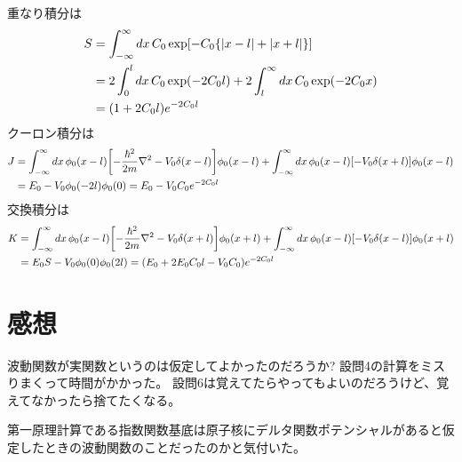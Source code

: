 \documentclass[../ap_2008.tex]{subfiles}
\begin{document}
\section{}
重なり積分は
\begin{equation}\begin{aligned}[b]
    S &= \int_{-\infty}^\infty dx\,C_0\exp[-C_0\qty{\abs{x-l}+\abs{x+l}}]\\
    &= 2\int_0^l dx\,C_0 \exp(-2C_0l) + 2 \int_l^{\infty}dx\,C_0\exp(-2C_0x)\\
    &= (1+2C_0l)e^{-2C_0l}
\end{aligned}\end{equation}
クーロン積分は
\begin{equation}\begin{aligned}[b]
    J &=\int_{-\infty}^\infty dx\, \phi_0(x-l)\qty[-\frac{\hbar^2}{2m}\laplacian-V_0\delta(x-l)]\phi_0(x-l)
    +\int_{-\infty}^\infty dx\, \phi_0(x-l)\qty[-V_0\delta(x+l)]\phi_0(x-l)\\
    &= E_0-V_0\phi_0(-2l)\phi_0(0)
    = E_0-V_0C_0e^{-2C_0l}
\end{aligned}\end{equation}
交換積分は
\begin{equation}\begin{aligned}[b]
    K &=\int_{-\infty}^\infty dx\, \phi_0(x-l)\qty[-\frac{\hbar^2}{2m}\laplacian-V_0\delta(x+l)]\phi_0(x+l)
    +\int_{-\infty}^\infty dx\, \phi_0(x-l)\qty[-V_0\delta(x-l)]\phi_0(x+l)\\
    &= E_0S-V_0\phi_0(0)\phi_0(2l)
    = (E_0+2E_0C_0l-V_0C_0)e^{-2C_0l}
\end{aligned}\end{equation}

\section*{感想}
波動関数が実関数というのは仮定してよかったのだろうか?
設問4の計算をミスりまくって時間がかかった。
設問6は覚えてたらやってもよいのだろうけど、覚えてなかったら捨てたくなる。

第一原理計算である指数関数基底は原子核にデルタ関数ポテンシャルがあると仮定したときの波動関数のことだったのかと気付いた。
\end{document}
